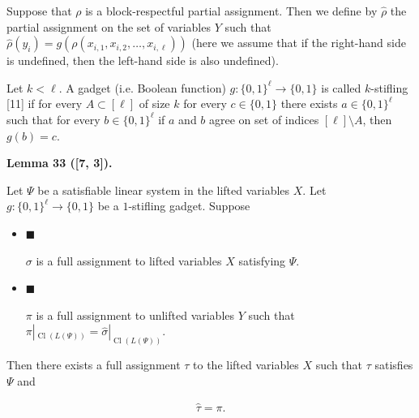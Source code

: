 \documentclass[10pt,a4paper]{article}
\begin{document}
Suppose that $\rho$ is a block-respectful partial assignment. Then we define by $\hat{\rho}$ the partial assignment on the set of variables $Y$ such that $\hat{\rho}(y_{i})=g(\rho(x_{i,1},x_{i,2},\dots,x_{i,\ell}))$ (here we assume that if the right-hand side is undefined, then the left-hand
side is also undefined).\par



Let $k<\ell$. A gadget (i.e. Boolean function) $g:\{0,1\}^{\ell}\to\{0,1\}$ is called $k$-stifling [11] if for every $A\subset[\ell]$ of size $k$ for every $c\in\{0,1\}$ there exists $a\in\{0,1\}^{\ell}$ such that for every $b\in\{0,1\}^{\ell}$ if $a$ and $b$ agree on set of indices $[\ell]\setminus A$, then $g(b)=c$.\par



\par\medskip\noindent\textbf{
Lemma 33 ([7, 3]).
}\par



Let $\Psi$ be a satisfiable linear system in the lifted variables $X$. Let $g\colon\{0,1\}^{\ell}\to\{0,1\}$ be a $1$-stifling gadget. Suppose\par


\begin{itemize}


\item 
$\blacksquare$ 


$\sigma$ is a full assignment to lifted variables $X$ satisfying $\Psi$.\par





\item 
$\blacksquare$ 


$\pi$ is a full assignment to unlifted variables $Y$ such that $\pi|_{\mathop{\mathrm{Cl}}(L(\Psi))}=\hat{\sigma}|_{\mathop{\mathrm{Cl}}(L(\Psi))}$.\par





\end{itemize}


Then there exists a full assignment $\tau$ to the lifted variables $X$ such that $\tau$ satisfies $\Psi$ and\par





 
\[\begin{gathered}\hat{\tau}=\pi.\end{gathered}\] 
 
\end{document}
